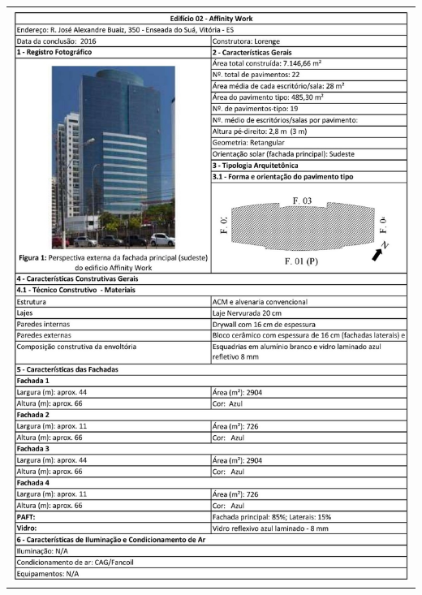 \begin{table}[H]
    \centering
    \begin{tabular}{l}
        \includegraphics[width=\textwidth]{figures/appendices/edificio02.jpg}
    \end{tabular}
\end{table}
\pagebreak
